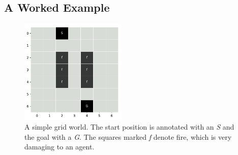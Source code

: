 \documentclass[xcolor={table}]{beamer}
\begin{document}
\subsection{A Worked Example}



 \begin{frame} 
\begin{figure}[htb]
       \begin{centering}
       \includegraphics[width=0.45\textwidth]{images/fmlpda_figure_11_4.pdf}
       \caption{A simple grid world. The start position is annotated with an \textit{S} and the goal with a \textit{G}. The squares marked \textit{f} denote fire, which is very damaging to an agent.}
       \label{fig:rl_grid_world}
       \end{centering}
\end{figure}
\end{frame} 
\end{document}
